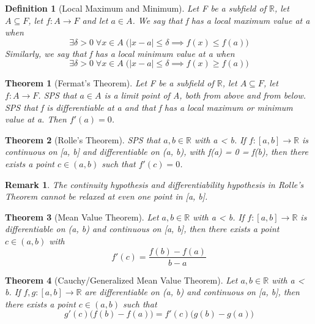 \documentclass[11pt, oneside]{book}
\theoremstyle{break}
\newtheorem{thm}{Theorem}[section]
\newtheorem*{remark}{Remark}
\newtheorem{defn}{Definition}[section]
\newcommand{\bb}[1]{\mathbb{#1}}		%
\begin{document}
\begin{defn}[Local Maximum and Minimum]
	Let F be a subfield of $\bb{R}$, let $A \subseteq F$, let $f: A \to F$ and let $a \in A$. We say that f has a local maximum value at a when
	\[
		\exists \delta > 0 \; \forall x \in A \; \big(|x-a| \leq \delta \implies f(x) \leq f(a) \big)
	\]
	Similarly, we say that f has a local minimum value at a when
	\[
		\exists \delta > 0 \; \forall x \in A \; \big( |x-a| \leq \delta \implies f(x) \geq f(a) \big)
	\]
\end{defn}

\begin{thm}[Fermat's Theorem]
	Let F be a subfield of $\bb{R}$, let $A \subseteq F$, let $f: A \to F$. SPS that $a \in A$ is a limit point of A, both from above and from below. SPS that f is differentiable at a and that f has a local maximum or minimum value at a. Then $f'(a) = 0$.
\end{thm}

\begin{thm}[Rolle's Theorem]
	SPS that $a, b \in \bb{R}$ with a < b. If $f: [a, b] \to \bb{R}$ is continuous on [a, b] and differentiable on (a, b), with f(a) = 0 = f(b), then there exists a point $c \in (a, b)$ such that $f'(c) = 0$.
\end{thm}

\begin{remark}
	The continuity hypothesis and differentiability hypothesis in Rolle's Theorem cannot be relaxed at even one point in [a, b].
\end{remark}

\begin{thm}[Mean Value Theorem]
	Let $a, b \in \bb{R}$ with a < b. If $f: [a, b] \to \bb{R}$ is differentiable on (a, b) and continuous on [a, b], then there exists a point $c \in (a, b)$ with
	\[
		f'(c) = \frac{f(b) - f(a)}{b - a}
	\]
\end{thm}

\begin{thm}[Cauchy/Generalized Mean Value Theorem]
	Let $a, b \in \bb{R}$ with a < b. If $f, g: [a, b] \to \bb{R}$ are differentiable on (a, b) and continuous on [a, b], then there exists a point $c \in (a, b)$ such that
	\[
		g'(c)\big( f(b) - f(a) \big) = f'(c)\big( g(b) - g(a) \big)
	\]
\end{thm}
\end{document}

